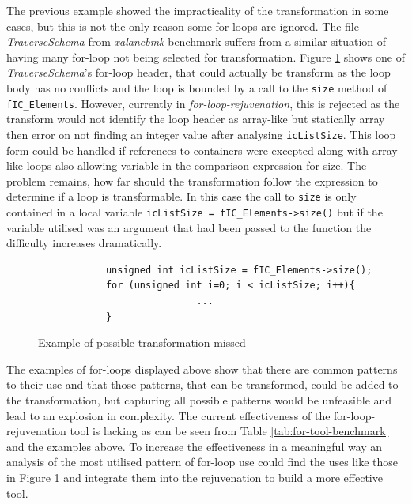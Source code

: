 \documentclass[bsc,frontabs,singlespacing,twoside,parskip,deptreport]{infthesis}
\begin{document}
The previous example showed the impracticality of the transformation in some cases, but this is not the only reason some for-loops are ignored. The file \textit{TraverseSchema} from \textit{xalancbmk} benchmark suffers from a similar situation of having many for-loop not being selected for transformation. Figure \ref{fig:no-rejuv-indirect-var} shows one of \textit{TraverseSchema}'s for-loop header, that could actually be transform as the loop body has no conflicts and the loop is bounded by a call to the \texttt{size} method of \texttt{fIC\_Elements}. However, currently in \textit{for-loop-rejuvenation}, this is rejected as the transform would not identify the loop header as array-like but statically array then error on not finding an integer value after analysing \texttt{icListSize}. This loop form could be handled if references to containers were excepted along with array-like loops also allowing variable in the comparison expression for size. The problem remains, how far should the transformation follow the expression to determine if a loop is transformable. In this case the call to \texttt{size} is only contained in a local variable \texttt{icListSize = fIC\_Elements->size()} but if the variable utilised was an argument that had been passed to the function the difficulty increases dramatically. 

\begin{figure}[H]
    \centering
    \begin{verbatim}
            unsigned int icListSize = fIC_Elements->size();
            for (unsigned int i=0; i < icListSize; i++){ 
                            ... 
            }
    \end{verbatim}
    \caption{Example of possible transformation missed}
    \label{fig:no-rejuv-indirect-var}
\end{figure}

The examples of for-loops displayed above show that there are common patterns to their use and that those patterns, that can be transformed, could be added to the transformation, but capturing all possible patterns would be unfeasible and lead to an explosion in complexity. The current effectiveness of the for-loop-rejuvenation tool is lacking as can be seen from Table \ref{tab:for-tool-benchmark} and the examples above. To increase the effectiveness in a meaningful way an analysis of the most utilised pattern of for-loop use could find the uses like those in Figure \ref{fig:no-rejuv-indirect-var} and integrate them into the rejuvenation to build a more effective tool.
\end{document}
